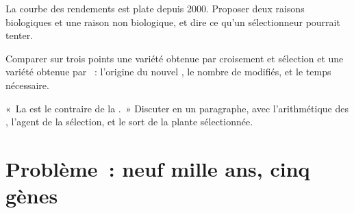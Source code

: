 \begin{exercise}[$\star\star\star$]\label{exo:g12:domesticated-plants:13}
La courbe des rendements est plate depuis 2000. Proposer deux raisons
biologiques et une raison non biologique, et dire ce qu'un
sélectionneur pourrait tenter.
\end{exercise}

\begin{exercise}[$\star\star\star$]\label{exo:g12:domesticated-plants:14}
Comparer sur trois points une variété obtenue par croisement et
sélection et une variété obtenue par ~: l'origine du nouvel
, le nombre de  modifiés, et le temps nécessaire.
\end{exercise}

\begin{exercise}[$\star\star\star$]\label{exo:g12:domesticated-plants:15}
«~La  est le contraire de la .~»
Discuter en un paragraphe, avec l'arithmétique des , l'agent de la sélection, et le sort de la plante
sélectionnée.
\end{exercise}

\section{Problème~: neuf mille ans, cinq gènes}

